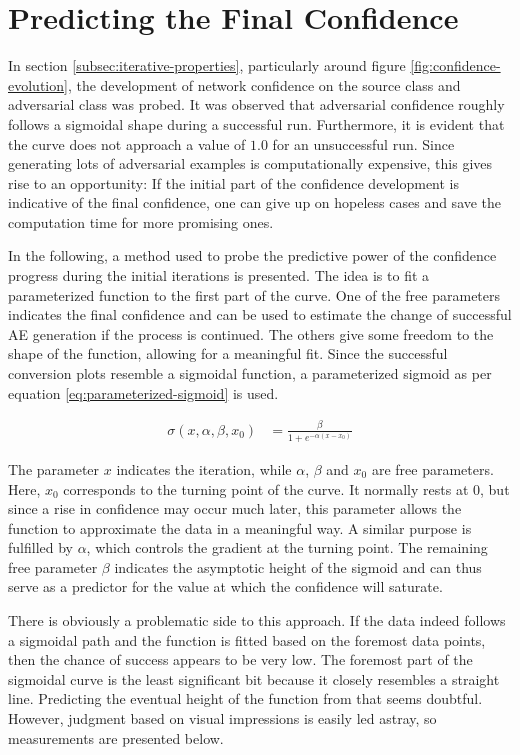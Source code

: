 \documentclass[11pt, a4paper]{article}
\newcommand\braces[1]{\left(#1\right)}
\begin{document}
\section{Predicting the Final Confidence}
\label{sec:predicting-final-confidence}
In section \ref{subsec:iterative-properties}, particularly around figure \ref{fig:confidence-evolution}, the development of network confidence on the source class and adversarial class was probed. It was observed that adversarial confidence roughly follows a sigmoidal shape during a successful run. Furthermore, it is evident that the curve does not approach a value of $1.0$ for an unsuccessful run. Since generating lots of adversarial examples is computationally expensive, this gives rise to an opportunity: If the initial part of the confidence development is indicative of the final confidence, one can give up on hopeless cases and save the computation time for more promising ones.

In the following, a method used to probe the predictive power of the confidence progress during the initial iterations is presented. The idea is to fit a parameterized function to the first part of the curve. One of the free parameters indicates the final confidence and can be used to estimate the change of successful AE generation if the process is continued. The others give some freedom to the shape of the function, allowing for a meaningful fit. Since the successful conversion plots resemble a sigmoidal function, a parameterized sigmoid as per equation \eqref{eq:parameterized-sigmoid} is used.

\begin{align}
	\sigma \braces{x, \alpha, \beta, x_0} &= \frac{\beta}{1 + e^{-\alpha \braces{x - x_0}}} \label{eq:parameterized-sigmoid}
\end{align}

The parameter $x$ indicates the iteration, while $\alpha$, $\beta$ and $x_0$ are free parameters. Here, $x_0$ corresponds to the turning point of the curve. It normally rests at $0$, but since a rise in confidence may occur much later, this parameter allows the function to approximate the data in a meaningful way. A similar purpose is fulfilled by $\alpha$, which controls the gradient at the turning point. The remaining free parameter $\beta$ indicates the asymptotic height of the sigmoid and can thus serve as a predictor for the value at which the confidence will saturate.

There is obviously a problematic side to this approach. If the data indeed follows a sigmoidal path and the function is fitted based on the foremost data points, then the chance of success appears to be very low. The foremost part of the sigmoidal curve is the least significant bit because it closely resembles a straight line. Predicting the eventual height of the function from that seems doubtful. However, judgment based on visual impressions is easily led astray, so measurements are presented below.
\end{document}
